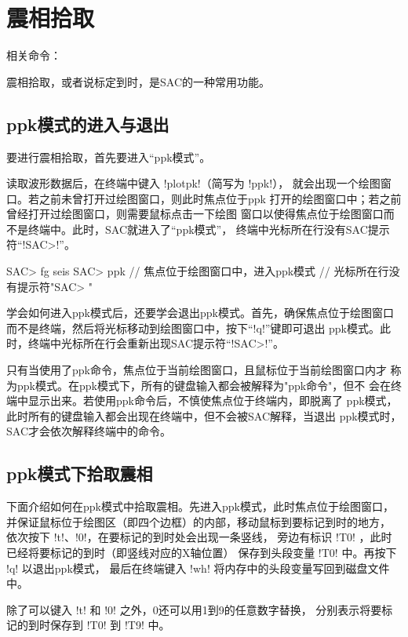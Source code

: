 \section{震相拾取}
\label{sec:phase-picking}
相关命令：

震相拾取，或者说标定到时，是SAC的一种常用功能。

\subsection{ppk模式的进入与退出}
要进行震相拾取，首先要进入``ppk模式''。

读取波形数据后，在终端中键入 !plotpk!（简写为 !ppk!），
就会出现一个绘图窗口。若之前未曾打开过绘图窗口，则此时焦点位于ppk
打开的绘图窗口中；若之前曾经打开过绘图窗口，则需要鼠标点击一下绘图
窗口以使得焦点位于绘图窗口而不是终端中。此时，SAC就进入了``ppk模式''，
终端中光标所在行没有SAC提示符``!SAC>!''。

\begin{SACCode}
SAC> fg seis
SAC> ppk    // 焦点位于绘图窗口中，进入ppk模式
            // 光标所在行没有提示符"SAC> "
\end{SACCode}

学会如何进入ppk模式后，还要学会退出ppk模式。首先，确保焦点位于绘图窗口
而不是终端，然后将光标移动到绘图窗口中，按下``!q!''键即可退出
ppk模式。此时，终端中光标所在行会重新出现SAC提示符``!SAC>!''。

\begin{note}
只有当使用了ppk命令，焦点位于当前绘图窗口，且鼠标位于当前绘图窗口内才
称为ppk模式。在ppk模式下，所有的键盘输入都会被解释为"ppk命令"，但不
会在终端中显示出来。若使用ppk命令后，不慎使焦点位于终端内，即脱离了
ppk模式，此时所有的键盘输入都会出现在终端中，但不会被SAC解释，当退出
ppk模式时，SAC才会依次解释终端中的命令。
\end{note}

\subsection{ppk模式下拾取震相}
下面介绍如何在ppk模式中拾取震相。先进入ppk模式，此时焦点位于绘图窗口，
并保证鼠标位于绘图区（即四个边框）的内部，移动鼠标到要标记到时的地方，
依次按下 !t!、!0!，在要标记的到时处会出现一条竖线，
旁边有标识 !T0! ，此时已经将要标记的到时（即竖线对应的X轴位置）
保存到头段变量 !T0! 中。再按下 !q! 以退出ppk模式，
最后在终端键入 !wh! 将内存中的头段变量写回到磁盘文件中。

除了可以键入 !t! 和 !0! 之外，0还可以用1到9的任意数字替换，
分别表示将要标记的到时保存到 !T0! 到 !T9! 中。


